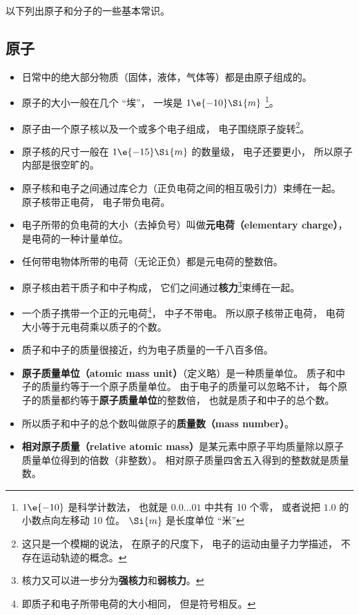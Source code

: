 
\begin{issues}
\issueDraft
\end{issues}


以下列出原子和分子的一些基本常识。

\subsection{原子}
\begin{itemize}
\item 日常中的绝大部分物质（固体，液体，气体等）都是由原子组成的。
\item 原子的大小一般在几个 “埃”， 一埃是 $1\e{-10}\Si{m}$ \footnote{$1\e{-10}$ 是科学计数法， 也就是 $0.0\dots01$ 中共有 10 个零， 或者说把 $1.0$ 的小数点向左移动 10 位。 $\Si{m}$ 是长度单位 “米”}。 %
\item 原子由一个原子核以及一个或多个电子组成， 电子围绕原子旋转\footnote{这只是一个模糊的说法， 在原子的尺度下， 电子的运动由量子力学描述， 不存在运动轨迹的概念。}。
\item 原子核的尺寸一般在 $1\e{-15}\Si{m}$ 的数量级， 电子还要更小， 所以原子内部是很空旷的。
\item 原子核和电子之间通过库仑力（正负电荷之间的相互吸引力）束缚在一起。 原子核带正电荷， 电子带负电荷。 %
\item 电子所带的负电荷的大小（去掉负号）叫做\textbf{元电荷（elementary charge）}， 是电荷的一种计量单位。 \item 任何带电物体所带的电荷（无论正负）都是元电荷的整数倍。
\item 原子核由若干质子和中子构成， 它们之间通过\textbf{核力}\footnote{核力又可以进一步分为\textbf{强核力}和\textbf{弱核力}。}束缚在一起。
\item 一个质子携带一个正的元电荷\footnote{即质子和电子所带电荷的大小相同， 但是符号相反。}， 中子不带电。 所以原子核带正电荷， 电荷大小等于元电荷乘以质子的个数。
\item 质子和中子的质量很接近，约为电子质量的一千八百多倍。
\item \textbf{原子质量单位（atomic mass unit）}（定义略）是一种质量单位。 质子和中子的质量约等于一个原子质量单位。 由于电子的质量可以忽略不计， 每个原子的质量都约等于\textbf{原子质量单位}的整数倍， 也就是质子和中子的总个数。
\item 所以质子和中子的总个数叫做原子的\textbf{质量数（mass number）}。
\item \textbf{相对原子质量（relative atomic mass）}是某元素中原子平均质量除以原子质量单位得到的倍数（非整数）。 相对原子质量四舍五入得到的整数就是质量数。

\end{itemize}
